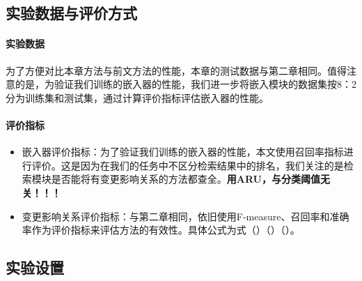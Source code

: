 \subsection{实验数据与评价方式}

\paragraph{实验数据} 为了方便对比本章方法与前文方法的性能，本章的测试数据与第二章相同。值得注意的是，为验证我们训练的嵌入器的性能，我们进一步将嵌入模块的数据集按8：2分为训练集和测试集，通过计算评价指标评估嵌入器的性能。

\paragraph{评价指标} 

\begin{itemize}

    \item 嵌入器评价指标：为了验证我们训练的嵌入器的性能，本文使用召回率指标进行评价。这是因为在我们的任务中不区分检索结果中的排名，我们关注的是检索模块是否能将有变更影响关系的方法都查全。\textbf{用ARU，与分类阈值无关！！！}

    \item 变更影响关系评价指标：与第二章相同，依旧使用F-measure、召回率和准确率作为评价指标来评估方法的有效性。具体公式为式（）（）（）。
    
\end{itemize}

\subsection{实验设置}

